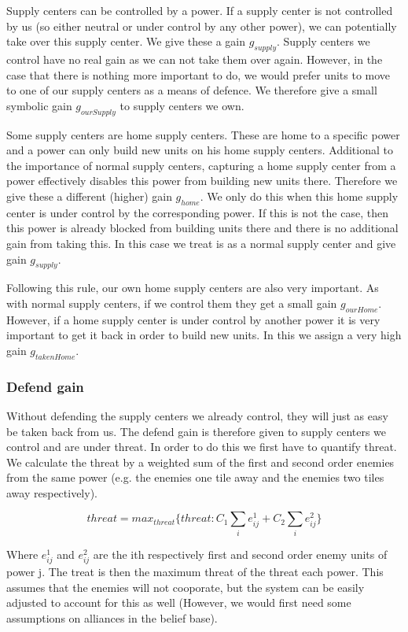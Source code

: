 \documentclass[a4paper]{article} %
\begin{document}
Supply centers can be controlled by a power. If a supply center is not controlled by us (so either neutral or under control by any other power), we can potentially take over this supply center. We give these a gain $g_{supply}$. Supply centers we control have no real gain as we can not take them over again. However, in the case that there is nothing more important to do, we would prefer units to move to one of our supply centers as a means of defence. We therefore give a small symbolic gain $g_{ourSupply}$ to supply centers we own. 

Some supply centers are home supply centers. These are home to a specific power and a power can only build new units on his home supply centers. Additional to the importance of normal supply centers, capturing a home supply center from a power effectively disables this power from building new units there. Therefore we give these a different (higher) gain $g_{home}$. We only do this when this home supply center is under control by the corresponding power. If this is not the case, then this power is already blocked from building units there and there is no additional gain from taking this. In this case we treat is as a normal supply center and give gain $g_{supply}$.

Following this rule, our own home supply centers are also very important. As with normal supply centers, if we control them they get a small gain $g_{ourHome}$. However, if a home supply center is under control by another power it is very important to get it back in order to build new units. In this we assign a very high gain $g_{takenHome}$. 

\subsubsection{Defend gain}

Without defending the supply centers we already control, they will just as easy be taken back from us. The defend gain is therefore given to supply centers we control and are under threat. In order to do this we first have to quantify threat. We calculate the threat by a weighted sum of the first and second order enemies from the same power (e.g. the enemies one tile away and the enemies two tiles away respectively). 

$$threat = max_{threat}\{ threat : C_1 \sum_{i} e^{1}_{ij} + C_2 \sum_{i} e^{2}_{ij}\}$$

Where $e^1_{ij}$ and $e^2_{ij}$ are the ith respectively first and second order enemy units of power j. The treat is then the maximum threat of the threat each power. This assumes that the enemies will not cooporate, but the system can be easily adjusted to account for this as well (However, we would first need some assumptions on  alliances in the belief base). 
\end{document}

